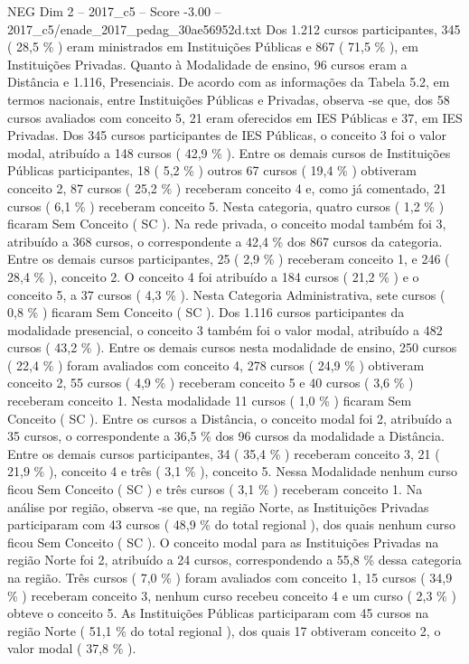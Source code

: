 \begin{textsample}{NEG Dim 2 – 2017\_c5 – Score -3.00 – 2017\_c5/enade\_2017\_pedag\_30ae56952d.txt}
Dos 1.212 cursos participantes, 345 ( 28,5 \% ) eram ministrados em Instituições Públicas e 867 ( 71,5 \% ), em Instituições Privadas.
Quanto à Modalidade de ensino, 96 cursos eram a Distância e 1.116, Presenciais.
De acordo com as informações da Tabela 5.2, em termos nacionais, entre Instituições Públicas e Privadas, observa -se que, dos 58 cursos avaliados com conceito 5, 21 eram oferecidos em IES Públicas e 37, em IES Privadas.
Dos 345 cursos participantes de IES Públicas, o conceito 3 foi o valor modal, atribuído a 148 cursos ( 42,9 \% ).
Entre os demais cursos de Instituições Públicas participantes, 18 ( 5,2 \% ) outros 67 cursos ( 19,4 \% ) obtiveram conceito 2, 87 cursos ( 25,2 \% ) receberam conceito 4 e, como já comentado, 21 cursos ( 6,1 \% ) receberam conceito 5.
Nesta categoria, quatro cursos ( 1,2 \% ) ficaram Sem Conceito ( SC ).
Na rede privada, o conceito modal também foi 3, atribuído a 368 cursos, o correspondente a 42,4 \% dos 867 cursos da categoria.
Entre os demais cursos participantes, 25 ( 2,9 \% ) receberam conceito 1, e 246 ( 28,4 \% ), conceito 2.
O conceito 4 foi atribuído a 184 cursos ( 21,2 \% ) e o conceito 5, a 37 cursos ( 4,3 \% ).
Nesta Categoria Administrativa, sete cursos ( 0,8 \% ) ficaram Sem Conceito ( SC ).
Dos 1.116 cursos participantes da modalidade presencial, o conceito 3 também foi o valor modal, atribuído a 482 cursos ( 43,2 \% ).
Entre os demais cursos nesta modalidade de ensino, 250 cursos ( 22,4 \% ) foram avaliados com conceito 4, 278 cursos ( 24,9 \% ) obtiveram conceito 2, 55 cursos ( 4,9 \% ) receberam conceito 5 e 40 cursos ( 3,6 \% ) receberam conceito 1.
Nesta modalidade 11 cursos ( 1,0 \% ) ficaram Sem Conceito ( SC ).
Entre os cursos a Distância, o conceito modal foi 2, atribuído a 35 cursos, o correspondente a 36,5 \% dos 96 cursos da modalidade a Distância.
Entre os demais cursos participantes, 34 ( 35,4 \% ) receberam conceito 3, 21 ( 21,9 \% ), conceito 4 e três ( 3,1 \% ), conceito 5.
Nessa Modalidade nenhum curso ficou Sem Conceito ( SC ) e três cursos ( 3,1 \% ) receberam conceito 1.
Na análise por região, observa -se que, na região Norte, as Instituições Privadas participaram com 43 cursos ( 48,9 \% do total regional ), dos quais nenhum curso ficou Sem Conceito ( SC ).
O conceito modal para as Instituições Privadas na região Norte foi 2, atribuído a 24 cursos, correspondendo a 55,8 \% dessa categoria na região.
Três cursos ( 7,0 \% ) foram avaliados com conceito 1, 15 cursos ( 34,9 \% ) receberam conceito 3, nenhum curso recebeu conceito 4 e um curso ( 2,3 \% ) obteve o conceito 5.
As Instituições Públicas participaram com 45 cursos na região Norte ( 51,1 \% do total regional ), dos quais 17 obtiveram conceito 2, o valor modal ( 37,8 \% ).

\end{textsample}
